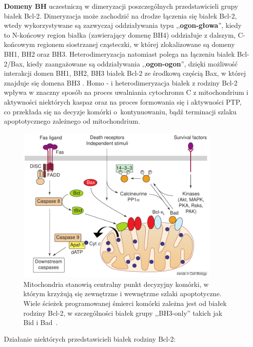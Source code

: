 \textbf{Domeny BH} uczestniczą w dimeryzacji poszczególnych przedstawicieli grupy białek Bcl-2. Dimeryzacja może zachodzić na drodze łączenia się białek Bcl-2, wtedy wykorzystywane są zazwyczaj oddziaływania typu ,,\textbf{ogon-głowa}'', kiedy to N-końcowy region białka (zawierający domenę BH4) oddziałuje z dalszym, C-końcowym regionem siostrzanej cząsteczki, w której zlokalizowane są domeny BH1, BH2 oraz BH3. Heterodimeryzacja natomiast polega na łączeniu białek Bcl-2/Bax, kiedy zaangażowane są oddziaływania ,,\textbf{ogon-ogon}'', dzięki możliwość interakcji domen BH1, BH2, BH3 białek Bcl-2 ze środkową częścią Bax, w której znajduje się domena BH3 \cite{Chao1998,Sattler1997}. Homo - i heterodimeryzacja białek z rodziny Bcl-2 wpływa w znaczny sposób na proces uwalniania cytochromu C z mitochondrium i aktywności niektórych kaspaz oraz na proces formowania się i aktywności PTP, co przekłada się na decyzje komórki o~kontynuowaniu, bądź terminacji szlaku apoptotycznego zależnego od mitochondrium.

\begin{figure}[!ht]
  \centering
  \includegraphics[width=0.9\textwidth]{rysunki/rozdzial_1/apoptosisMitoPath.png}
  \caption [Mitochondrialna ścieżka apoptozy]{Mitochondria stanowią centralny punkt decyzyjny komórki, w którym krzyżują się zewnętrzne i wewnętrzne szlaki apoptotyczne. Wiele ścieżek programowanej śmierci komórki zależna jest od białek rodziny Bcl-2, w szczególności białek grupy ,,BH3-only'' takich jak Bid i Bad~\cite{Leo2005}.}
  \label{fig:apoptosisMitoPath}
\end{figure}


\bigskip

\noindent Działanie niektórych przedstawicieli białek rodziny Bcl-2:

